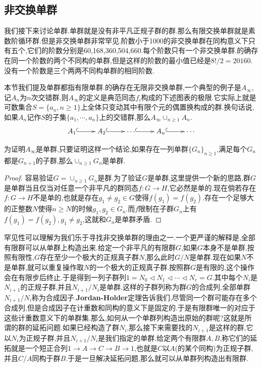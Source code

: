 \newpage
\subsection{非交换单群}

我们接下来讨论单群.单群就是没有非平凡正规子群的群.那么有限交换单群就是素数阶循环群.但是非交换单群非常罕见.阶数小于1000的非交换单群在同构意义下只有五个,它们的阶数分别是60,168,360,504,660.每个阶数只有一个非交换单群.的确存在同一个阶数的两个不同构的单群,但是这样的阶数的最小值已经是$8!/2=20160$.没有一个阶数是三个两两不同构单群的相同阶数.

本节我们提及单群都指有限单群.的确存在无限非交换单群,一个典型的例子是$A_{\infty}$,记$A_n$为$n$次交错群,则$A_{\infty}$的定义是典范同态$f_i$构成的下述图表的极限.它实际上就是可数集合$S=\{a_n,n\ge1\}$上全体只变动其中有限个元的偶置换构成的群.换句话说,如果$A_n$记作$S$的子集$\{a_1,\cdots,a_n\}$上的交错群,那么$A_{\infty}\cup_ {n\ge1}A_n$.
$$\xymatrix{A_1\ar@{^{(}->}[r]&A_2\ar@{^{(}->}[r]&\cdots\ar@{^{(}->}[r]&A_n\ar@{^{(}->}[r]&\cdots}$$

为证明$A_{\infty}$是单群,只要证明这样一个结论,如果存在一列单群$\{G_n\}_{n\ge1}$,满足每个$G_n$都是$G_{n+1}$的子群,那么$\cup_{n\ge1}G_n$是单群.
\begin{proof}
	
	容易验证$G=\cup_{n\ge1}G_n$是群.为了验证$G$是单群,这里提供一个新的思路,群$G$是单群当且仅当对任意一个非平凡的群同态$f:G\to H$,它必然是单的.现在倘若存在$f:G\to H$不是单的,也就是存在$g_1\not=g_2\in G$使得$f(g_1)=f(g_2)$.存在一个足够大的正整数$N$使得$n\ge N$的时候$g_1,g_2\in G_n$.而$f$限制在子群$G_n$上有$f(g_1)=f(g_2),g_1\not=g_2$,这就和$G_n$是单群矛盾.
	
\end{proof}

罕见性可以理解为我们乐于寻找非交换单群的理由之一.一个更严谨的解释是,全部有限群可以从单群上构造出来.给定一个非平凡的有限群$G$,如果$G$本身不是单群,按照有限性,$G$存在至少一个极大的正规真子群$N$,那么此时$G/N$是单群.现在如果$N$不是单群,就可以重复操作取$N$的一个极大的正规真子群.按照群$G$是有限的,这个操作会在有限步后终止.于是得到一列子群列$1=N_0\triangleleft N_1\triangleleft\cdots\triangleleft N_r=G$.其中每个$N_i$是$N_ {i+1}$的正规子群,并且$N_{i+1}/N_i$是单群.这样的子群列称为群$G$的合成列,全部单群$N_{i+1}/N_i$称为合成因子.\textbf{Jordan-Holder}定理告诉我们,尽管同一个群可能存在多个合成列,但是合成因子在计重数和同构的意义下是固定的.于是有限群唯一的对应于这些计重数意义下的单群集.那么,如何从一个单群列构造出原始的群呢?这就是所谓的群的延拓问题.如果已经构造了群$N_i$,那么接下来需要找的$N_{i+1}$是这样的群,它以$N_i$为正规子群,并且$N_{i+1}/N_i$是我们指定的单群.给定两个有限群$A,B$,称它们的延拓就是一个短正合列$1\to A\to C\to B\to1$,也就是$C$以$A$(的某个同构)为正规子群,并且$C/A$同构于群$B$.于是一旦解决延拓问题,那么就可以从单群列构造出有限群.

